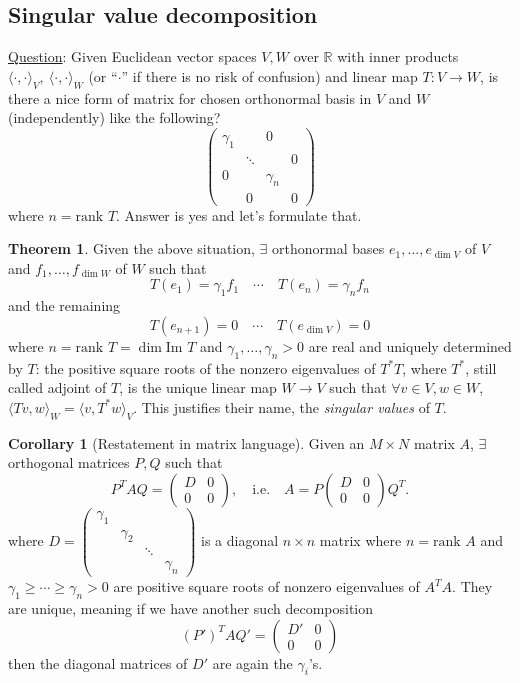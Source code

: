 \documentclass[a4paper]{article}
\newcommand{\rank}{\text{rank }}
\theoremstyle{definition}
\newtheorem{thm}[defn]{Theorem}
\newtheorem{coro}[defn]{Corollary}
\begin{document}
\subsection{Singular value decomposition}
\underline{Question}: Given Euclidean vector spaces $V,W$ over $\mathbb R$ with inner products $\langle \cdot ,\cdot \rangle_V,\ \langle \cdot,\cdot \rangle_W$ (or ``$\cdot$'' if there is no risk of confusion) and linear map $T:V\rightarrow W$, is there a nice form of matrix for chosen orthonormal basis in $V$ and $W$ (independently) like the following?
\[
\begin{pmatrix}
\gamma_1 & & 0 \\
 & \ddots & &  0\\
0 & & \gamma_n \\
 & 0 & & 0
\end{pmatrix}
\]
where $n=\rank T$. Answer is yes and let's formulate that.
\begin{thm}
Given the above situation, $\exists$ orthonormal bases $e_1,\ldots,e_{\dim V}$ of $V$ and $f_1,\ldots,f_{\dim W}$ of $W$ such that
\[
T(e_1)=\gamma_1 f_1 \quad \cdots \quad T(e_n) = \gamma _n f_n
\]
and the remaining
\[
T(e_{n+1})=0 \quad \cdots \quad T({e_{\dim V}}) =0
\]
where $n=\rank T=\dim \text{Im } T$ and $\gamma_1,\ldots,\gamma_n >0$ are real and uniquely determined by $T$: the positive square roots of the nonzero eigenvalues of $T^\ast T$, where $T^\ast$, still called adjoint of $T$, is the unique linear map $W\rightarrow V$ such that $\forall v\in V,w\in W$, $\langle Tv,w\rangle _W = \langle v,T^\ast w\rangle_V$. This justifies their name, the \textit{singular values} of $T$.
\end{thm}
\begin{coro}[Restatement in matrix language]
Given an $M\times N$ matrix $A$, $\exists$ orthogonal matrices $P,Q$ such that
\[
P^T AQ= \begin{pmatrix}
D & 0 \\ 0 & 0
\end{pmatrix},\quad \text{i.e.}\quad A=P\begin{pmatrix}
D & 0 \\ 0 & 0
\end{pmatrix} Q^T.
\]
where $D=\begin{pmatrix}
\gamma_1 & \\ & \gamma _2 \\ & & \ddots \\ &&& \gamma_n
\end{pmatrix}$ is a diagonal $n\times n$ matrix where $n=\rank A$ and $\gamma_1 \geq \cdots \geq \gamma_n >0$ are positive square roots of nonzero eigenvalues of $A^T A$. They are unique, meaning if we have another such decomposition
\[
\left(P'\right)^T AQ'= \begin{pmatrix}
D' & 0 \\ 0 & 0
\end{pmatrix}
\]
then the diagonal matrices of $D'$ are again the $\gamma_i$'s.
\end{coro}
\end{document}
